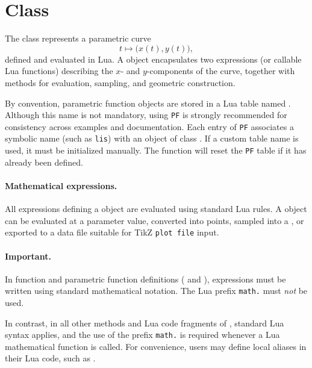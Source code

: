 \newpage
\section{Class }
\label{sec:class_pfct}

The  class represents a parametric curve
\[
t \longmapsto \bigl(x(t),y(t)\bigr),
\]
defined and evaluated in Lua. A  object encapsulates two
expressions (or callable Lua functions) describing the $x$- and $y$-components
of the curve, together with methods for evaluation, sampling, and geometric
construction.

By convention, parametric function objects are stored in a Lua table named
. Although this name is not mandatory, using \texttt{PF} is
strongly recommended for consistency across examples and documentation. Each
entry of \texttt{PF} associates a symbolic name (such as \texttt{lis}) with an
object of class . If a custom table name is used, it must be
initialized manually. The  function will
reset the \texttt{PF} table if it has already been defined.

\paragraph{Mathematical expressions.}
All expressions defining a  object are evaluated using standard
Lua rules. A  object can be evaluated at a parameter value, converted into
points, sampled into a , or exported to a data file suitable for
TikZ \texttt{plot file} input.

\paragraph{Important.}
In function and parametric function definitions
( and ),
expressions must be written using standard mathematical notation.
The Lua prefix \texttt{math.} must \emph{not} be used.

In contrast, in all other methods and Lua code fragments of
,
standard Lua syntax applies, and the use of the prefix \texttt{math.}
is required whenever a Lua mathematical function is called. For convenience, users may define local aliases in their Lua code, such as
.

